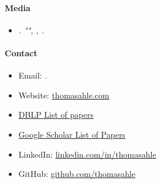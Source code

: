 \documentclass[11pt]{article}
\begin{document}
\paragraph{Media}
\begin{itemize}
   \item[]
      \emph{.
         "", , .}
\end{itemize}

\paragraph{Contact}
\begin{itemize}
   \item[]
      Email: \href{mailto:\VAR{authors['thdy'].email}}{}.
   \item[]
      Website: \href{http://www.thomasahle.com}{\underline{thomasahle.com}}
   \item[]
      \href{https://dblp1.uni-trier.de/pers/hd/a/Ahle:Thomas_D=}{\underline{DBLP List of papers}}
   \item[]
      \href{https://scholar.google.dk/citations?user=aRiVoYgAAAAJ}{\underline{Google Scholar List of Papers}}
   \item[]
      LinkedIn: \href{https://www.linkedin.com/in/thomasahle/}{\underline{linkedin.com/in/thomasahle}}
   \item[]
      GitHub: \href{https://github.com/thomasahle}{\underline{github.com/thomasahle}}
\end{itemize}
\end{document}
